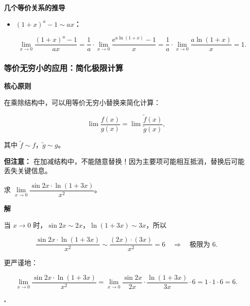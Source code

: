 \documentclass[fontset=fandol]{ctexart}
\newenvironment{custom}[1]{\par\noindent\textbf{#1}\quad}{\par\vspace{0.8em}}
\newenvironment{solution}{\par\noindent\textbf{解}\quad}{\hfill$\square$\par\vspace{0.8em}}
\newcommand{\ee}{\mathrm{e}}
\begin{document}
\begin{custom}{几个等价关系的推导}
\begin{itemize}
\[\]



\item \textbf{\((1+x)^a - 1 \sim ax\)：} 

\[

\lim_{x \to 0} \dfrac{(1+x)^a - 1}{ax} = \dfrac{1}{a} \cdot \lim_{x \to 0} \dfrac{\ee^{a\ln(1+x)} - 1}{x} = \dfrac{1}{a} \cdot \lim_{x \to 0} \dfrac{a\ln(1+x)}{x} = 1.

\]

\end{itemize}

\end{custom}



\subsubsection{等价无穷小的应用：简化极限计算}



\begin{custom}{核心原则}

在乘除结构中，可以用等价无穷小替换来简化计算：

\[

\lim \dfrac{f(x)}{g(x)} = \lim \dfrac{\tilde{f}(x)}{\tilde{g}(x)},

\]

其中 \(\tilde{f} \sim f\)，\(\tilde{g} \sim g\)。



\textbf{但注意：} 在加减结构中，不能随意替换！因为主要项可能相互抵消，替换后可能丢失关键信息。

\end{custom}



\begin{example}[乘除结构中的替换]

求 \(\lim\limits_{x \to 0} \dfrac{\sin 2x \cdot \ln(1+3x)}{x^2}\)。

\end{example}

\begin{solution}

当 \(x \to 0\) 时，\(\sin 2x \sim 2x\)，\(\ln(1+3x) \sim 3x\)，所以

\[

\dfrac{\sin 2x \cdot \ln(1+3x)}{x^2} \sim \dfrac{(2x) \cdot (3x)}{x^2} = 6 \quad \Rightarrow \quad \text{极限为 } 6.

\]

更严谨地：

\[

\lim_{x \to 0} \dfrac{\sin 2x \cdot \ln(1+3x)}{x^2} = \lim_{x \to 0} \dfrac{\sin 2x}{2x} \cdot \dfrac{\ln(1+3x)}{3x} \cdot 6 = 1 \cdot 1 \cdot 6 = 6.

\]

\end{solution}
\end{document}

